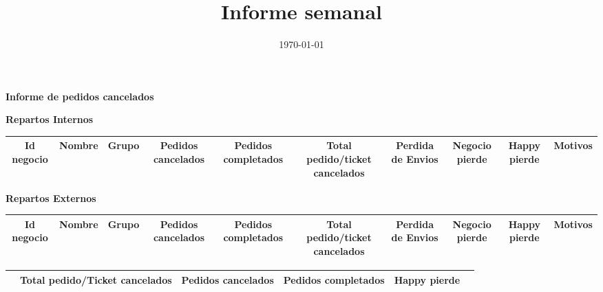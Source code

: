 \documentclass[a4paper,landscape]{article}
\title{Informe semanal}
\date{\today}
\author{}
\begin{document}
\vspace{10mm}
\centering
\begin{Huge}
\textbf{Informe de pedidos cancelados}

\vspace{2mm}

\end{Huge}



\Huge \textbf {Repartos Internos}
\begin{table}[!htbp]
\centering
\begin{adjustbox}{width=1\textwidth}
\begin{tabular}{c|c|c|c|c|c|c|c|c|c}
\hline
\rowcolor{int}
 Id negocio & Nombre & Grupo & Pedidos cancelados & Pedidos completados & Total pedido/ticket cancelados & Perdida de Envios & Negocio pierde &	Happy pierde & Motivos \\
\hline\hline
\hline
\end{tabular}
\end{adjustbox}
\end{table}

\vspace{5mm}

\Huge \textbf {Repartos Externos}
\begin{table}[!htbp]
\centering
\begin{adjustbox}{width=1\textwidth}
\begin{tabular}{c|c|c|c|c|c|c|c|c|c}
\hline
\rowcolor{ext}
 Id negocio & Nombre & Grupo & Pedidos cancelados & Pedidos completados & Total pedido/ticket cancelados & Perdida de Envios & Negocio pierde &	Happy pierde & Motivos \\
\hline\hline
\hline
\end{tabular}
\end{adjustbox}
\end{table}


\vspace{5mm}


\begin{table}[!htbp]
\centering
\begin{adjustbox}{width=0.6\textwidth}
\begin{tabular}{c|c|c|c|c|c|}
\hline
& Total pedido/Ticket cancelados & Pedidos cancelados & Pedidos completados  & Happy pierde  \\
\hline\hline
\hline

\end{tabular}
\end{adjustbox}
\end{table}

\end{document}
